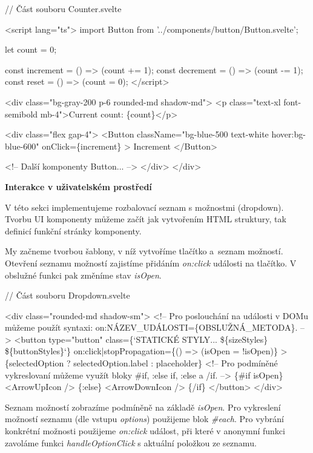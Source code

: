 \begin{prog}
// Část souboru Counter.svelte

<script lang="ts">
  import Button from '../components/button/Button.svelte';

  let count = 0;

  const increment = () => (count += 1);
  const decrement = () => (count -= 1);
  const reset = () => (count = 0);
</script>

<div class="bg-gray-200 p-6 rounded-md shadow-md">
  <p class="text-xl font-semibold mb-4">Current count: \{count\}</p>

  <div class="flex gap-4">
    <Button 
      className="bg-blue-500 text-white hover:bg-blue-600" 
      onClick=\{increment\}
    >
      Increment
    </Button>

    <!-- Další komponenty Button... -->
  </div>
</div>
\end{prog}

\begin{flushleft}
  \textbf{Interakce v uživatelském prostředí}
\end{flushleft}

V této sekci implementujeme rozbalovací seznam s možnostmi (dropdown). Tvorbu UI komponenty můžeme začít jak vytvořením HTML struktury, tak definicí funkční stránky komponenty.

My začneme tvorbou šablony, v níž vytvoříme tlačítko a~seznam možností. Otevření seznamu možností zajistíme přidáním \emph{on:click} události na tlačítko. V obslužné funkci pak změníme stav \emph{isOpen}.

\begin{prog}
// Část souboru Dropdown.svelte

<div class="rounded-md shadow-sm">
  <!-- Pro poslouchání na události v DOMu můžeme použít syntaxi: 
    on:NÁZEV_UDÁLOSTI=\{OBSLUŽNÁ_METODA\}. -->
  <button
    type="button"
    class=\{`STATICKÉ STYLY... \$\{sizeStyles\} \$\{buttonStyles\}`\}
    on:click|stopPropagation=\{() => (isOpen = !isOpen)\}
  >
    \{selectedOption ? selectedOption.label : placeholder\}
    <!-- Pro podmíněné vykreslovaní můžeme využít bloky
      #if, :else if, :else a /if. -->
    \{#if isOpen\}
      <ArrowUpIcon />
    \{:else\}
      <ArrowDownIcon />
    \{/if\}
  </button>
</div>
\end{prog}

Seznam možností zobrazíme podmíněně na základě \emph{isOpen}. Pro vykreslení možností seznamu (dle vstupu \emph{options}) použijeme blok \emph{\#each}. 
Pro vybrání konkrétní možnosti použijeme \emph{on:click} událost, při které v anonymní funkci zavoláme funkci \emph{handleOptionClick} s aktuální položkou ze seznamu.

